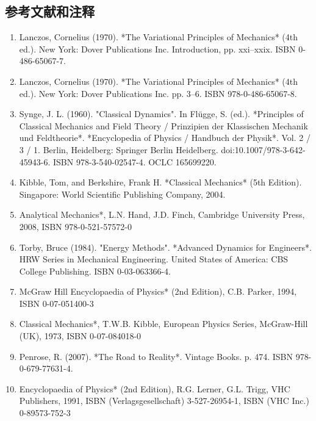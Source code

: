 \subsection{参考文献和注释}
\begin{enumerate}
\item Lanczos, Cornelius (1970). *The Variational Principles of Mechanics* (4th ed.). New York: Dover Publications Inc. Introduction, pp. xxi–xxix. ISBN 0-486-65067-7.
\item Lanczos, Cornelius (1970). *The Variational Principles of Mechanics* (4th ed.). New York: Dover Publications Inc. pp. 3–6. ISBN 978-0-486-65067-8.
\item Synge, J. L. (1960). "Classical Dynamics". In Flügge, S. (ed.). *Principles of Classical Mechanics and Field Theory / Prinzipien der Klassischen Mechanik und Feldtheorie*. *Encyclopedia of Physics / Handbuch der Physik*. Vol. 2 / 3 / 1. Berlin, Heidelberg: Springer Berlin Heidelberg. doi:10.1007/978-3-642-45943-6. ISBN 978-3-540-02547-4. OCLC 165699220.
\item Kibble, Tom, and Berkshire, Frank H. *Classical Mechanics* (5th Edition). Singapore: World Scientific Publishing Company, 2004.
\item Analytical Mechanics*, L.N. Hand, J.D. Finch, Cambridge University Press, 2008, ISBN 978-0-521-57572-0
\item Torby, Bruce (1984). "Energy Methods". *Advanced Dynamics for Engineers*. HRW Series in Mechanical Engineering. United States of America: CBS College Publishing. ISBN 0-03-063366-4.
\item McGraw Hill Encyclopaedia of Physics* (2nd Edition), C.B. Parker, 1994, ISBN 0-07-051400-3
\item Classical Mechanics*, T.W.B. Kibble, European Physics Series, McGraw-Hill (UK), 1973, ISBN 0-07-084018-0
\item Penrose, R. (2007). *The Road to Reality*. Vintage Books. p. 474. ISBN 978-0-679-77631-4.
\item Encyclopaedia of Physics* (2nd Edition), R.G. Lerner, G.L. Trigg, VHC Publishers, 1991, ISBN (Verlagsgesellschaft) 3-527-26954-1, ISBN (VHC Inc.) 0-89573-752-3
\end{enumerate}